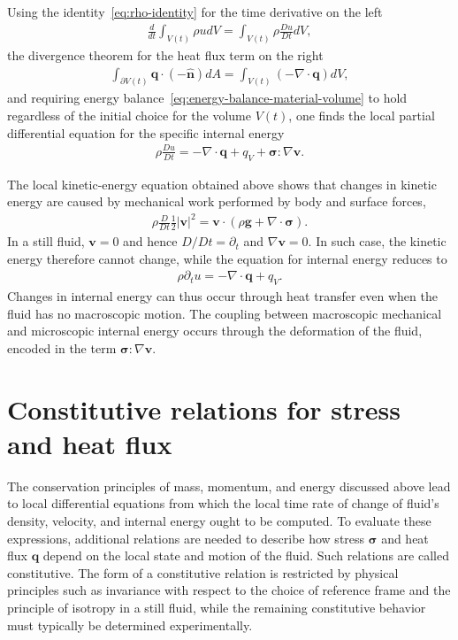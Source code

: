 Using the identity~\eqref{eq:rho-identity} for the time derivative on the left
\begin{align}
    \frac{d}{dt}\int_{V(t)}\rho udV=\int_{V(t)}\rho\frac{Du}{Dt}dV,
\end{align}
the divergence theorem for the heat flux term on the right
\begin{align}
    \int_{\partial V(t)}\bm{q}\cdot(-\bm{\hat{n}})dA=\int_{V(t)}(-\nabla\cdot\bm{q})dV,
\end{align}
and requiring energy balance~\eqref{eq:energy-balance-material-volume} to hold regardless of the initial choice for the volume $V(t)$, one finds the local partial differential equation for the specific internal energy
\begin{align}\label{eq:internal-energy-equation}
    \rho\frac{Du}{Dt}=-\nabla\cdot\bm{q}+q_V+\bm{\sigma}:\nabla\bm{v}.
\end{align}
\begin{example}
    The local kinetic-energy equation obtained above shows that changes in
    kinetic energy are caused by mechanical work performed by body and
    surface forces,
    \begin{align*}
        \rho\frac{D}{Dt}\frac{1}{2}|\bm{v}|^2
        =
        \bm{v}\cdot(\rho\bm{g}+\nabla\cdot\bm{\sigma}).
    \end{align*}
    In a still fluid, $\bm{v}=0$ and hence $D/Dt=\partial_t$ and
    $\nabla\bm{v}=0$. In such case, the kinetic energy therefore cannot change, while the equation for internal energy reduces to
    \begin{align*}
        \rho\partial_t u=-\nabla\cdot\bm{q}+q_V.
    \end{align*}
    Changes in internal energy can thus occur through heat transfer even
    when the fluid has no macroscopic motion. The coupling between
    macroscopic mechanical and microscopic internal energy occurs through
    the deformation of the fluid, encoded in the term $\bm{\sigma}:\nabla\bm{v}$.
\end{example}

\section{Constitutive relations for stress and heat flux}
The conservation principles of mass, momentum, and energy discussed above lead to local differential equations from which the local time rate of change of fluid's density, velocity, and internal energy ought to be computed. To evaluate these expressions, additional relations are needed to describe how stress $\bm{\sigma}$ and heat flux $\bm{q}$ depend on the local state and motion of the fluid. Such relations are called constitutive. The form of a constitutive relation is restricted by physical principles such as invariance with respect to the choice of reference frame and the principle of isotropy in a still fluid, while the remaining constitutive behavior must typically be determined experimentally.

